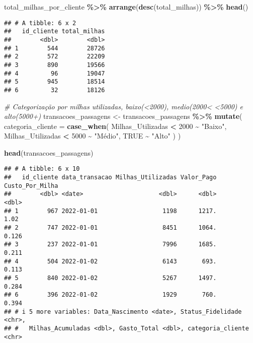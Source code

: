 \documentclass[
]{article}
\newenvironment{Shaded}{\begin{snugshade}}{\end{snugshade}}
\newcommand{\AttributeTok}[1]{\textcolor[rgb]{0.13,0.29,0.53}{#1}}
\newcommand{\CommentTok}[1]{\textcolor[rgb]{0.56,0.35,0.01}{\textit{#1}}}
\newcommand{\ConstantTok}[1]{\textcolor[rgb]{0.56,0.35,0.01}{#1}}
\newcommand{\DecValTok}[1]{\textcolor[rgb]{0.00,0.00,0.81}{#1}}
\newcommand{\FunctionTok}[1]{\textcolor[rgb]{0.13,0.29,0.53}{\textbf{#1}}}
\newcommand{\NormalTok}[1]{#1}
\newcommand{\OtherTok}[1]{\textcolor[rgb]{0.56,0.35,0.01}{#1}}
\newcommand{\SpecialCharTok}[1]{\textcolor[rgb]{0.81,0.36,0.00}{\textbf{#1}}}
\newcommand{\StringTok}[1]{\textcolor[rgb]{0.31,0.60,0.02}{#1}}
\begin{document}
\begin{Shaded}
\begin{Highlighting}[]
\NormalTok{total\_milhas\_por\_cliente }\SpecialCharTok{\%\textgreater{}\%} \FunctionTok{arrange}\NormalTok{(}\FunctionTok{desc}\NormalTok{(total\_milhas)) }\SpecialCharTok{\%\textgreater{}\%} \FunctionTok{head}\NormalTok{()}
\end{Highlighting}
\end{Shaded}

\begin{verbatim}
## # A tibble: 6 x 2
##   id_cliente total_milhas
##        <dbl>        <dbl>
## 1        544        28726
## 2        572        22209
## 3        890        19566
## 4         96        19047
## 5        945        18514
## 6         32        18126
\end{verbatim}

\begin{Shaded}
\begin{Highlighting}[]
\CommentTok{\# Categorização por milhas utilizadas, baixo(\textless{}2000), medio(2000\textless{} \textless{}5000) e alto(5000+)}
\NormalTok{transacoes\_passagens }\OtherTok{\textless{}{-}}\NormalTok{ transacoes\_passagens }\SpecialCharTok{\%\textgreater{}\%} \FunctionTok{mutate}\NormalTok{(}
  \AttributeTok{categoria\_cliente =} \FunctionTok{case\_when}\NormalTok{(}
\NormalTok{    Milhas\_Utilizadas }\SpecialCharTok{\textless{}} \DecValTok{2000} \SpecialCharTok{\textasciitilde{}} \StringTok{"Baixo"}\NormalTok{,}
\NormalTok{    Milhas\_Utilizadas }\SpecialCharTok{\textless{}} \DecValTok{5000} \SpecialCharTok{\textasciitilde{}} \StringTok{"Médio"}\NormalTok{,}
    \ConstantTok{TRUE} \SpecialCharTok{\textasciitilde{}} \StringTok{"Alto"}
\NormalTok{  )}
\NormalTok{)}
\end{Highlighting}
\end{Shaded}

\begin{Shaded}
\begin{Highlighting}[]
\FunctionTok{head}\NormalTok{(transacoes\_passagens)}
\end{Highlighting}
\end{Shaded}

\begin{verbatim}
## # A tibble: 6 x 10
##   id_cliente data_transacao Milhas_Utilizadas Valor_Pago Custo_Por_Milha
##        <dbl> <date>                     <dbl>      <dbl>           <dbl>
## 1        967 2022-01-01                  1198      1217.           1.02 
## 2        747 2022-01-01                  8451      1064.           0.126
## 3        237 2022-01-01                  7996      1685.           0.211
## 4        504 2022-01-02                  6143       693.           0.113
## 5        840 2022-01-02                  5267      1497.           0.284
## 6        396 2022-01-02                  1929       760.           0.394
## # i 5 more variables: Data_Nascimento <date>, Status_Fidelidade <chr>,
## #   Milhas_Acumuladas <dbl>, Gasto_Total <dbl>, categoria_cliente <chr>
\end{verbatim}
\end{document}
